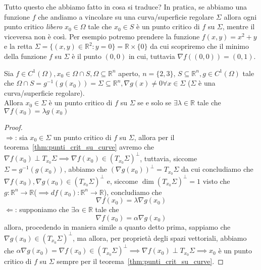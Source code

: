 \begin{remark}
Tutto questo che abbiamo fatto in cosa si traduce? In pratica, se abbiamo una funzione $f$ che andiamo a vincolare su una curva/superficie regolare $\Sigma$ allora ogni punto critico \emph{libero} $x_0 \in \Omega$ tale che $x_0 \in S$ è un punto critico di $f$ su $\Sigma$, mentre il viceversa non è così. Per esempio potremo prendere la funzione $f(x, y) = x^2 + y$ e la retta $\Sigma = \{(x, y) \in \mathbb{R}^2 : y=0 \} = \mathbb{R} \times \{ 0 \}$ da cui scopriremo che il minimo della funzione $f$ su $\Sigma$ è il punto $(0, 0)$ in cui, tuttavia $\nabla f((0, 0)) = (0, 1)$. 
\end{remark}
\begin{theorem}
Sia $f \in C^{1} (\Omega), x_0 \in \Omega \cap S, \Omega \subseteq \mathbb{R}^n$ aperto, $n= \{ 2, 3 \}$, $S \subseteq \mathbb{R}^n, g \in C^1 (\Omega)$ tale che $\Omega \cap S = g^{-1}(g(x_0)) = \Sigma \subseteq \mathbb{R}^n, \nabla g(x) \neq 0 \forall x \in \Sigma$ ($\Sigma$ è una curva/superficie regolare). \\
Allora $x_0 \in \Sigma$ è un punto critico di $f$ su $\Sigma$ se e solo se $\exists \lambda \in \mathbb{R}$ tale che $\nabla f(x_0) = \lambda g(x_0)$
\end{theorem}
\begin{proof} \hspace{1cm} \\
$\boxed{\Rightarrow}$: sia $x_0 \in \Sigma$ un punto critico di $f$ su $\Sigma$, allora per il teorema~\ref{thm:punti_crit_su_curve}  avremo che $\nabla f(x_0) \perp T_{x_0} \Sigma \implies \nabla f(x_0) \in (T_{x_0} \Sigma)^{\perp}$, tuttavia, siccome $\Sigma = g^{-1}(g(x_0))$, abbiamo che $(\nabla g(x_0))^{\perp} = T_{x_0} \Sigma$ da cui concludiamo che $\nabla f(x_0), \nabla g(x_0) \in (T_{x_0} \Sigma)^{\perp}$ e, siccome $\dim{(T_{x_0} \Sigma)^{\perp}} = 1$ visto che $g: \mathbb{R}^n \to \mathbb{R}$($\implies df(x_0): \mathbb{R}^n \to \mathbb{R}$), concludiamo che 
$$
\nabla f(x_0) = \lambda \nabla g(x_0)
$$
$\boxed{\Leftarrow}$: supponiamo che $\exists \alpha \in \mathbb{R}$ tale che
$$
\nabla f(x_0) = \alpha \nabla g(x_0)
$$
allora, procedendo in maniera simile a quanto detto prima, sappiamo che $\nabla g(x_0) \in (T_{x_0} \Sigma)^{\perp}$, ma allora, per proprietà degli spazi vettoriali, abbiamo che $\alpha \nabla g(x_0) = \nabla f(x_0) \in (T_{x_0} \Sigma)^{\perp} \implies \nabla f(x_0) \perp T_{x_0} \Sigma \implies x_0$ è un punto critico di $f$ su $\Sigma$ sempre per il teorema~\ref{thm:punti_crit_su_curve}.
\end{proof}
